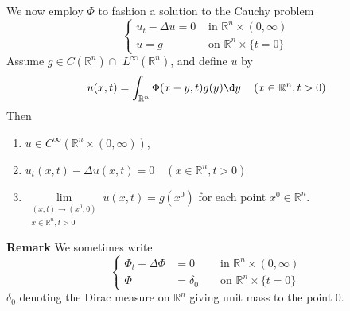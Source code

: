 \begin{theorem}
    We now employ $\Phi$ to fashion a solution to the  Cauchy problem
    \begin{equation*}
        \left\{
        \begin{aligned}
            u_t-\Delta u=0 & \text { in } \mathbb{R}^n \times(0, \infty) \\
            u=g            & \text { on } \mathbb{R}^n \times\{t=0\}
        \end{aligned}
        \right.
    \end{equation*}
    Assume $g \in C\left(\mathbb{R}^n\right) \cap$ $L^{\infty}\left(\mathbb{R}^n\right)$, and define $u$ by
    \begin{equation*}
        u(x, t)  =\int_{\mathbb{R}^n} \Phi(x-y, t) g(y) \d y
        \quad\left(x \in \mathbb{R}^n, t>0\right)
    \end{equation*}
    Then
    \begin{enumerate}
        \item
              $u \in C^{\infty}\left(\mathbb{R}^n \times(0, \infty)\right)$,

        \item
              $u_t(x, t)-\Delta u(x, t)=0 \quad\left(x \in \mathbb{R}^n, t>0\right)$

        \item
              $\lim\limits_{\substack{(x, t) \rightarrow(x^0, 0) \\ x \in \mathbb{R}^n, t>0}} u(x, t)=g\left(x^0\right)$ for each point $x^0 \in \mathbb{R}^n$.
    \end{enumerate}
    \textbf{Remark} We sometimes write
    \begin{equation*}
        \left\{\begin{aligned}
            \Phi_t-\Delta \Phi & =0        &  & \text { in } \mathbb{R}^n \times(0, \infty) \\
            \Phi               & =\delta_0 &  & \text { on } \mathbb{R}^n \times\{t=0\}
        \end{aligned}\right.
    \end{equation*}
    $\delta_0$ denoting the Dirac measure on $\mathbb{R}^n$ giving unit mass to the point $0$.
\end{theorem}

